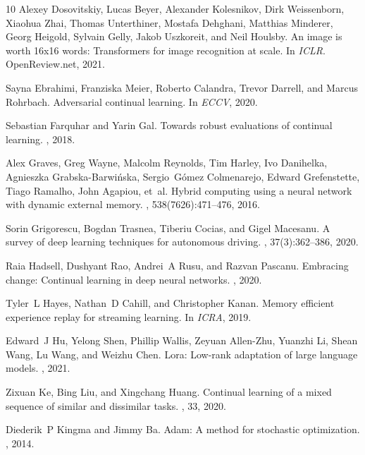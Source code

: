 \documentclass[10pt,twocolumn,letterpaper]{article}
\begin{document}
\begin{thebibliography}{10}
Alexey Dosovitskiy, Lucas Beyer, Alexander Kolesnikov, Dirk Weissenborn,
  Xiaohua Zhai, Thomas Unterthiner, Mostafa Dehghani, Matthias Minderer, Georg
  Heigold, Sylvain Gelly, Jakob Uszkoreit, and Neil Houlsby.
\newblock An image is worth 16x16 words: Transformers for image recognition at
  scale.
\newblock In {\em ICLR}. OpenReview.net, 2021.

Sayna Ebrahimi, Franziska Meier, Roberto Calandra, Trevor Darrell, and Marcus
  Rohrbach.
\newblock Adversarial continual learning.
\newblock In {\em ECCV}, 2020.

Sebastian Farquhar and Yarin Gal.
\newblock Towards robust evaluations of continual learning.
, 2018.

Alex Graves, Greg Wayne, Malcolm Reynolds, Tim Harley, Ivo Danihelka, Agnieszka
  Grabska-Barwi{\'n}ska, Sergio~G{\'o}mez Colmenarejo, Edward Grefenstette,
  Tiago Ramalho, John Agapiou, et~al.
\newblock Hybrid computing using a neural network with dynamic external memory.
, 538(7626):471--476, 2016.

Sorin Grigorescu, Bogdan Trasnea, Tiberiu Cocias, and Gigel Macesanu.
\newblock A survey of deep learning techniques for autonomous driving.
, 37(3):362--386, 2020.

Raia Hadsell, Dushyant Rao, Andrei~A Rusu, and Razvan Pascanu.
\newblock Embracing change: Continual learning in deep neural networks.
, 2020.

Tyler~L Hayes, Nathan~D Cahill, and Christopher Kanan.
\newblock Memory efficient experience replay for streaming learning.
\newblock In {\em ICRA}, 2019.

Edward~J Hu, Yelong Shen, Phillip Wallis, Zeyuan Allen-Zhu, Yuanzhi Li, Shean
  Wang, Lu Wang, and Weizhu Chen.
\newblock Lora: Low-rank adaptation of large language models.
, 2021.

Zixuan Ke, Bing Liu, and Xingchang Huang.
\newblock Continual learning of a mixed sequence of similar and dissimilar
  tasks.
, 33, 2020.

Diederik~P Kingma and Jimmy Ba.
\newblock Adam: A method for stochastic optimization.
, 2014.


\end{thebibliography}
\end{document}
